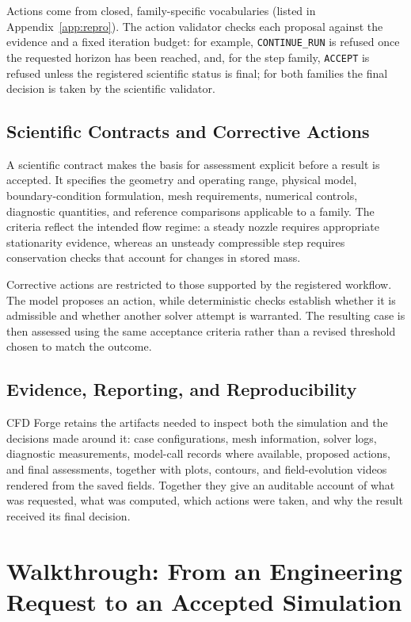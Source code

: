\documentclass[11pt]{article}
\begin{document}
Actions come from closed, family-specific vocabularies (listed in
Appendix~\ref{app:repro}). The action validator checks each proposal against
the evidence and a fixed iteration budget: for example, \texttt{CONTINUE\_RUN}
is refused once the requested horizon has been reached, and, for the step
family, \texttt{ACCEPT} is refused unless the registered scientific status
is final; for both families the final decision is taken by the scientific
validator.

\subsection{Scientific Contracts and Corrective Actions}
\label{sec:contracts}

A scientific contract makes the basis for assessment explicit before
a result is accepted. It specifies the geometry and operating range,
physical model, boundary-condition formulation, mesh requirements,
numerical controls, diagnostic quantities, and reference comparisons
applicable to a family. The criteria reflect the intended flow
regime: a steady nozzle requires appropriate stationarity evidence,
whereas an unsteady compressible step requires conservation checks
that account for changes in stored mass.

Corrective actions are restricted to those supported by the registered
workflow. The model proposes an action, while deterministic checks
establish whether it is admissible and whether another solver attempt
is warranted. The resulting case is then assessed using the same
acceptance criteria rather than a revised threshold chosen to match
the outcome.

\subsection{Evidence, Reporting, and Reproducibility}
\label{sec:provenance}

CFD Forge retains the artifacts needed to inspect both the simulation
and the decisions made around it: case configurations, mesh information,
solver logs, diagnostic measurements, model-call records where available,
proposed actions, and final assessments, together with plots, contours, and
field-evolution videos rendered from the saved fields. Together they give an
auditable account of what was requested, what was computed, which actions
were taken, and why the result received its final decision.

\section{Walkthrough: From an Engineering Request to an Accepted Simulation}
\label{sec:walkthrough}
\end{document}
